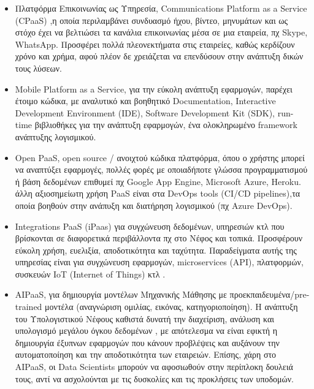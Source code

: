 \documentclass{article}
\begin{document}
\begin{itemize}
\item Πλατφόρμα Επικοινωνίας ως Υπηρεσία, Communications Platform as a Service    (CPaaS) ,η οποία περιλαμβάνει συνδυασμό ήχου, βίντεο, μηνυμάτων και ως στόχο έχει να βελτιώσει τα κανάλια επικοινωνίας μέσα σε μια εταιρεία, πχ Skype, WhatsApp.
Προσφέρει πολλά πλεονεκτήματα στις εταιρείες, καθώς κερδίζουν χρόνο και χρήμα, αφού πλέον δε χρειάζεται να επενδύσουν στην ανάπτυξη δικών τους λύσεων.
\item {}Mobile Platform as a Service, για την εύκολη ανάπτυξη εφαρμογών, παρέχει έτοιμο κώδικα, με αναλυτικό και βοηθητικό Documentation, Interactive Development Environment (IDE), Software Development Kit (SDK), run-time βιβλιοθήκες για την ανάπτυξη εφαρμογών, ένα ολοκληρωμένο framework ανάπτυξης λογισμικού.
\item Open PaaS, open source / ανοιχτού κώδικα πλατφόρμα, όπου ο χρήστης μπορεί να αναπτύξει εφαρμογές, πολλές φορές με οποιαδήποτε γλώσσα προγραμματισμού ή βάση δεδομένων επιθυμεί πχ Google App Engine, Microsoft Azure, Heroku.
 άλλη αξιοσημείωτη χρήση  PaaS είναι στα DevOps tools (CI/CD pipelines),τα οποία βοηθούν στην ανάπυξη και διατήρηση λογισμικού (πχ Azure DevOps).
\item Integrations PaaS (iPaas) για συγχώνευση δεδομένων, υπηρεσιών κτλ που βρίσκονται σε διαφορετικά περιβάλλοντα πχ στο Νέφος και τοπικά. Προσφέρουν εύκολη χρήση, ευελιξία, αποδοτικότητα και ταχύτητα. Παραδείγματα αυτής της υπηρεσίας είναι για συγχώνευση εφαρμογών, microservices (API), πλατφορμών, συσκευών IoT (Internet of Things) κτλ .
\item {}AIPaaS, για δημιουργία μοντέλων Μηχανικής Μάθησης με προεκπαιδευμένα/pre-trained μοντέλα (αναγνώριση ομιλίας, εικόνας, κατηγοριοποίηση). Η ανάπτυξη του Υπολογιστικού Νέφους καθιστά δυνατή την διαχείριση, ανάλυση και υπολογισμό μεγάλου όγκου δεδομένων , με απότελεσμα να είναι εφικτή η δημιουργία έξυπνων εφαρμογών που κάνουν προβλέψεις και αυξάνουν την αυτοματοποίηση και την αποδοτικότητα των εταιρειών. Επίσης, χάρη στο AIPaaS, οι Data Scientists μπορούν να αφοσιωθούν στην περίπλοκη δουλειά τους, αντί να ασχολούνται με τις δυσκολίες και τις προκλήσεις των υποδομών.

\end{itemize}
\end{document}
